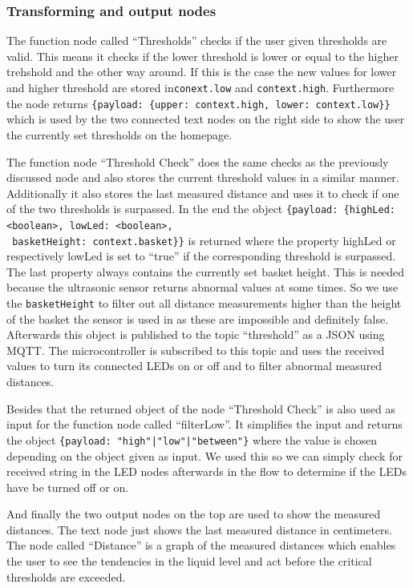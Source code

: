\documentclass{article}
\begin{document}
\subsubsection{Transforming and output nodes}
\label{sec:json}
The function node called \enquote{Thresholds} checks if the user given
thresholds are valid. This means it checks if the lower threshold is lower or
equal to the higher trehshold and the other way around. If this is the case the
new values for lower and higher threshold are stored in\verb|conext.low| and
\verb|context.high|. Furthermore the node returns
\verb|{payload: {upper: context.high, lower: context.low}}| which is used by the
two connected text nodes on the right side to show the user the currently set
thresholds on the homepage.\par
The function node \enquote{Threshold Check} does the same checks as the previously discussed node and also stores the current threshold values in a similar manner.  Additionally it also stores the last measured distance and uses it to check if one of the two thresholds is surpassed. In the end the object \verb|{payload: {highLed: <boolean>, lowLed: <boolean>,|\\
    \verb| basketHeight: context.basket}}| is returned where the property
highLed or respectively lowLed is set to \enquote{true} if the corresponding
threshold is surpassed. The last property always contains the currently set
basket height. This is needed because the ultrasonic sensor returns abnormal values at some times. So we use the \verb|basketHeight| to filter out all distance measurements higher than the height of the basket the sensor is used in as these are impossible and definitely false. Afterwards this object is published to the topic
\enquote{threshold} as a JSON using MQTT. The microcontroller is subscribed to
this topic and uses the received values to turn its connected LEDs on or off and
to filter abnormal measured distances.\par
Besides that the returned object of the node \enquote{Threshold Check} is also
used as input for the function node called \enquote{filterLow}. It simplifies
the input and returns the object \texttt{\{payload: "high"|"low"|"between"\}}
where the value is chosen depending on the object given as input. We used this
so we can simply check for received string in the LED nodes afterwards in the
flow to determine if the LEDs have be turned off or on.\par
And finally the two output nodes on the top are used to show the measured
distances. The text node just shows the last measured distance in centimeters.
The node called \enquote{Distance} is a graph of the measured distances which
enables the user to see the tendencies in the liquid level and act before
the critical thresholds are exceeded.
\end{document}
